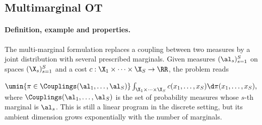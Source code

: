 \subsection{Multimarginal OT}
\label{subsec:multi-marginal}
\paragraph{Definition, example and properties.}
The multi-marginal formulation replaces a coupling between two measures by a joint distribution with several prescribed marginals. Given measures $(\al_s)_{s=1}^S$ on spaces $(\X_s)_{s=1}^S$ and a cost $c: \X_1 \times \cdots \times \X_S \to \RR$, the problem reads

\(\umin{\pi \in \Couplings(\al_1,\ldots,\al_S)} \int_{\X_1 \times \cdots \times \X_S} c(x_1,\ldots,x_S)\d\pi(x_1,\ldots,x_S),\)
where $\Couplings(\al_1,\ldots,\al_S)$ is the set of probability measures whose $s$-th marginal is $\al_s$. This is still a linear program in the discrete setting, but its ambient dimension grows exponentially with the number of marginals.

